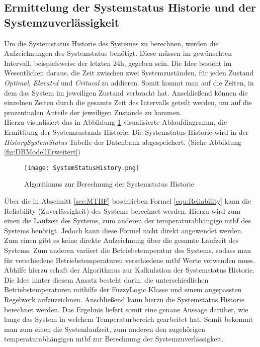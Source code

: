 \subsection{Ermittelung der Systemstatus Historie und der Systemzuverlässigkeit}\label{sec:SystemHistoryReliability}
Um die Systemstatus Historie des Systemes zu berechnen, werden die Aufzeichnungen des Systemstatus benötigt. Diese müssen im gewünschten Intervall, beispielsweise der letzten 24h, gegeben sein.
Die Idee besteht im Wesentlichen daraus, die Zeit zwischen zwei Systemzuständen, für jeden Zustand \textit{Optimal}, \textit{Elevated} und \textit{Critacal} zu addieren. Somit kommt man auf die Zeiten, in dem das System im jeweiligen Zustand verbracht hat. Anschließend können die einzelnen Zeiten durch die gesamte Zeit des Intervalls geteilt werden, um auf die prozentualen Anteile der jeweiligen Zustände zu kommen.\\
Hierzu visualisiert das in Abbildung \ref{fig:SystemStatusHistoryAlgorythmus} visualisierte Ablaufdiagramm, die Ermittlung der Systemzustands Historie. Die Systemstatus Historie wird in der \textit{HistorySystemStatus} Tabelle der Datenbank abgespeichert. (Siehe Abbildung \ref{fig:DBModellErweitert})
\begin{center}
    \begin{figure}[h!]
        \centering
        \texttt{[image: SystemStatusHistory.png]}
        \caption{Algorithmus zur Berechnung der Systemstatus Historie}
        \label{fig:SystemStatusHistoryAlgorythmus}
    \end{figure}
\end{center}
\vspace{-1cm}
Über die in Abschnitt \ref{sec:MTBF} beschrieben Formel \ref{equ:Reliability} kann die  Reliability (Zuverlässigkeit) des Systems berechnet werden. Hierzu wird zum einen die Laufzeit des Systems, zum anderen der temperaturabhängige \ac{mtbf} des Systems benötigt. Jedoch kann diese Formel nicht direkt angewendet werden. Zum einen gibt es keine direkte Aufzeichnung über die gesamte Laufzeit des Systems. Zum anderen variiert die Betriebstemperatur des Systems, sodass man für verschiedene Betriebstemperaturen verschiedene \ac{mtbf} Werte verwenden muss.\\
Abhilfe hierzu schaft der Algorithmus zur Kalkulation der Systemstatus Historie. Die Idee hinter diesem Ansatz besteht darin, die unterschiedlichen Betriebstemperaturen mithilfe der FuzzyLogic Klasse und einem angepassten Regelwerk aufzuzeichnen. Anschließend kann hierzu die Systemstatus Historie berechnet werden. Das Ergebnis liefert somit eine genaue Aussage darüber, wie lange das System in welchem Temperaturbereich gearbeitet hat. Somit bekommt man zum einen die Systemlaufzeit, zum anderen den zugehörigen temperaturabhängigen \ac{mtbf} zur Berechnung der Systemzuverlässigkeit.\\ 
